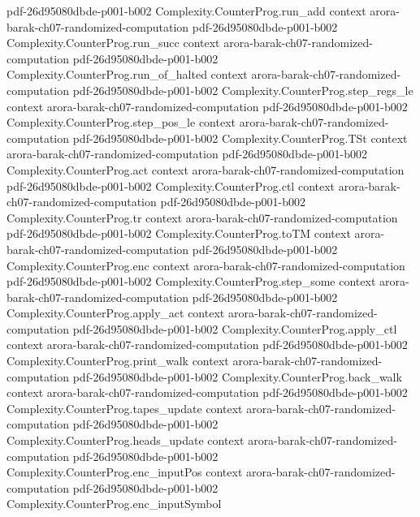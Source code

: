 \begin{theorem}
  {pdf-26d95080dbde-p001-b002}
\proofstep
  {Complexity.CounterProg.run_add}
  {context}
  {arora-barak-ch07-randomized-computation}
  {pdf-26d95080dbde-p001-b002}
\proofstep
  {Complexity.CounterProg.run_succ}
  {context}
  {arora-barak-ch07-randomized-computation}
  {pdf-26d95080dbde-p001-b002}
\proofstep
  {Complexity.CounterProg.run_of_halted}
  {context}
  {arora-barak-ch07-randomized-computation}
  {pdf-26d95080dbde-p001-b002}
\proofstep
  {Complexity.CounterProg.step_regs_le}
  {context}
  {arora-barak-ch07-randomized-computation}
  {pdf-26d95080dbde-p001-b002}
\proofstep
  {Complexity.CounterProg.step_pos_le}
  {context}
  {arora-barak-ch07-randomized-computation}
  {pdf-26d95080dbde-p001-b002}
\proofstep
  {Complexity.CounterProg.TSt}
  {context}
  {arora-barak-ch07-randomized-computation}
  {pdf-26d95080dbde-p001-b002}
\proofstep
  {Complexity.CounterProg.act}
  {context}
  {arora-barak-ch07-randomized-computation}
  {pdf-26d95080dbde-p001-b002}
\proofstep
  {Complexity.CounterProg.ctl}
  {context}
  {arora-barak-ch07-randomized-computation}
  {pdf-26d95080dbde-p001-b002}
\proofstep
  {Complexity.CounterProg.tr}
  {context}
  {arora-barak-ch07-randomized-computation}
  {pdf-26d95080dbde-p001-b002}
\proofstep
  {Complexity.CounterProg.toTM}
  {context}
  {arora-barak-ch07-randomized-computation}
  {pdf-26d95080dbde-p001-b002}
\proofstep
  {Complexity.CounterProg.enc}
  {context}
  {arora-barak-ch07-randomized-computation}
  {pdf-26d95080dbde-p001-b002}
\proofstep
  {Complexity.CounterProg.step_some}
  {context}
  {arora-barak-ch07-randomized-computation}
  {pdf-26d95080dbde-p001-b002}
\proofstep
  {Complexity.CounterProg.apply_act}
  {context}
  {arora-barak-ch07-randomized-computation}
  {pdf-26d95080dbde-p001-b002}
\proofstep
  {Complexity.CounterProg.apply_ctl}
  {context}
  {arora-barak-ch07-randomized-computation}
  {pdf-26d95080dbde-p001-b002}
\proofstep
  {Complexity.CounterProg.print_walk}
  {context}
  {arora-barak-ch07-randomized-computation}
  {pdf-26d95080dbde-p001-b002}
\proofstep
  {Complexity.CounterProg.back_walk}
  {context}
  {arora-barak-ch07-randomized-computation}
  {pdf-26d95080dbde-p001-b002}
\proofstep
  {Complexity.CounterProg.tapes_update}
  {context}
  {arora-barak-ch07-randomized-computation}
  {pdf-26d95080dbde-p001-b002}
\proofstep
  {Complexity.CounterProg.heads_update}
  {context}
  {arora-barak-ch07-randomized-computation}
  {pdf-26d95080dbde-p001-b002}
\proofstep
  {Complexity.CounterProg.enc_inputPos}
  {context}
  {arora-barak-ch07-randomized-computation}
  {pdf-26d95080dbde-p001-b002}
\proofstep
  {Complexity.CounterProg.enc_inputSymbol}

\end{theorem}
